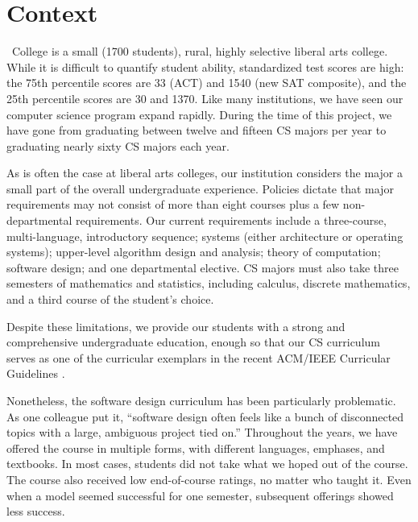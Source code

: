\section{Context}

\college\ College is a small (1700 students), rural, highly selective
liberal arts college.  While it is difficult to quantify student
ability, standardized test scores are high: the 75th percentile
scores are 33 (ACT) and 1540 (new SAT composite), and the 25th
percentile scores are 30 and 1370.  Like many institutions, we have
seen our computer science program expand rapidly.  During the time
of this project, we have gone from graduating between twelve and
fifteen CS majors per year to graduating nearly sixty CS majors
each year.

As is often the case at liberal arts colleges, our institution
considers the major a small part of the overall undergraduate
experience.  Policies dictate that
major requirements may not consist of more than eight courses
plus a few non-departmental requirements.
Our current
requirements include a three-course, multi-language, introductory
sequence; systems (either architecture or operating systems);
upper-level algorithm design and analysis; theory of computation;
software design; and one departmental elective.  CS majors must
also take three semesters of mathematics and statistics, including
calculus, discrete mathematics, and a third course of the student's
choice.

Despite these limitations, we provide our students with a strong
and comprehensive undergraduate education, enough so that our
CS curriculum serves as one of the curricular exemplars in the
recent ACM/IEEE Curricular Guidelines \cite{curriculum-2013}.

Nonetheless, the software design curriculum has been particularly
problematic.  As one colleague put it, ``software design often feels
like a bunch of disconnected topics %
with a large, ambiguous project tied on.''  Throughout the
years, we have offered the course in multiple forms, with different
languages, emphases, and textbooks.  In most
cases, students did not take what we hoped out of the course.  The
course also received low end-of-course ratings, no matter who taught it.  
Even when a model seemed
successful for one semester, subsequent offerings showed less success.


